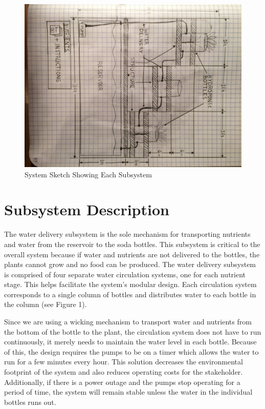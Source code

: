 \documentclass[12pt]{article}
\begin{document}
{    \pagebreak
    \begin{figure}[H]
        \centering
        \includegraphics[width=163mm]{resources/system-overview.jpg}
        \caption{System Sketch Showing Each Subsystem}
    \end{figure}
}


\section{Subsystem Description}


The water delivery subsystem is the sole mechanism for transporting nutrients and water from
the reservoir to the soda bottles. This subsystem is critical to the overall system because if water
and nutrients are not delivered to the bottles, the plants cannot grow and no food can be produced.
The water delivery subsystem is comprised of four separate water circulation systems, one for each
nutrient stage. This helps facilitate the system's modular design. Each circulation system
corresponds to a single column of bottles and distributes water to each bottle in the column (see
Figure 1).

Since we are using a wicking mechanism to transport water and nutrients from the bottom of the
bottle to the plant, the circulation system does not have to run continuously, it merely needs to
maintain the water level in each bottle. Because of this, the design requires the pumps to be on a
timer which allows the water to run for a few minutes every hour. This solution decreases the
environmental footprint of the system and also reduces operating costs for the stakeholder.
Additionally, if there is a power outage and the pumps stop operating for a period of time, the
system will remain stable unless the water in the individual bottles runs out.
\end{document}
